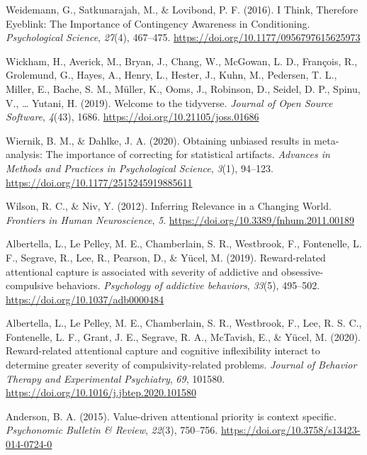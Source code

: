 \documentclass[
  man,
  floatsintext,
  longtable,
  nolmodern,
  notxfonts,
  notimes,
  mask,
  colorlinks=true,linkcolor=blue,citecolor=blue,urlcolor=blue]{apa7}
\newlength{\cslhangindent}
\newenvironment{CSLReferences}[2] %
 {\begin{list}{}{%
  \setlength{\itemindent}{0pt}
  \setlength{\leftmargin}{0pt}
  \setlength{\parsep}{0pt}
  \ifodd #1
   \setlength{\leftmargin}{\cslhangindent}
   \setlength{\itemindent}{-1\cslhangindent}
  \fi
  \setlength{\itemsep}{#2\baselineskip}}}
 {\end{list}}
\begin{document}
\begin{CSLReferences}{1}{0}
Weidemann, G., Satkunarajah, M., \& Lovibond, P. F. (2016). I Think,
Therefore Eyeblink: The Importance of Contingency Awareness in
Conditioning. \emph{Psychological Science}, \emph{27}(4), 467--475.
\url{https://doi.org/10.1177/0956797615625973}

Wickham, H., Averick, M., Bryan, J., Chang, W., McGowan, L. D.,
François, R., Grolemund, G., Hayes, A., Henry, L., Hester, J., Kuhn, M.,
Pedersen, T. L., Miller, E., Bache, S. M., Müller, K., Ooms, J.,
Robinson, D., Seidel, D. P., Spinu, V., \ldots{} Yutani, H. (2019).
Welcome to the {tidyverse}. \emph{Journal of Open Source Software},
\emph{4}(43), 1686. \url{https://doi.org/10.21105/joss.01686}

Wiernik, B. M., \& Dahlke, J. A. (2020). Obtaining unbiased results in
meta-analysis: The importance of correcting for statistical artifacts.
\emph{Advances in Methods and Practices in Psychological Science},
\emph{3}(1), 94--123. \url{https://doi.org/10.1177/2515245919885611}

Wilson, R. C., \& Niv, Y. (2012). Inferring {Relevance} in a {Changing
World}. \emph{Frontiers in Human Neuroscience}, \emph{5}.
\url{https://doi.org/10.3389/fnhum.2011.00189}

Albertella, L., Le Pelley, M. E., Chamberlain, S. R., Westbrook, F.,
Fontenelle, L. F., Segrave, R., Lee, R., Pearson, D., \& Yücel, M.
(2019). Reward-related attentional capture is associated with severity
of addictive and obsessive-compulsive behaviors. \emph{Psychology of
addictive behaviors}, \emph{33}(5), 495--502.
\url{https://doi.org/10.1037/adb0000484}

Albertella, L., Le Pelley, M. E., Chamberlain, S. R., Westbrook, F.,
Lee, R. S. C., Fontenelle, L. F., Grant, J. E., Segrave, R. A.,
McTavish, E., \& Yücel, M. (2020). Reward-related attentional capture
and cognitive inflexibility interact to determine greater severity of
compulsivity-related problems. \emph{Journal of Behavior Therapy and
Experimental Psychiatry}, \emph{69}, 101580.
\url{https://doi.org/10.1016/j.jbtep.2020.101580}

Anderson, B. A. (2015). Value-driven attentional priority is context
specific. \emph{Psychonomic Bulletin \& Review}, \emph{22}(3), 750--756.
\url{https://doi.org/10.3758/s13423-014-0724-0}


\end{CSLReferences}
\end{document}

